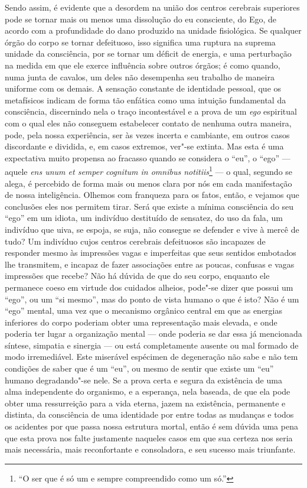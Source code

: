 Sendo assim, é evidente que a desordem na união dos centros cerebrais
superiores pode se tornar mais ou menos uma dissolução do eu
consciente, do Ego, de acordo com a profundidade do dano produzido na
unidade fisiológica.  Se qualquer órgão do corpo se tornar defeituoso,
isso significa uma ruptura na suprema unidade da consciência, por se
tornar um déficit de energia, e uma perturbação na medida em que ele
exerce influência sobre outros órgãos; é como quando, numa junta de
cavalos, um deles não desempenha seu trabalho de maneira uniforme com
os demais.  A sensação constante de identidade pessoal, que os
metafísicos indicam de forma tão enfática como uma intuição fundamental
da consciência, discernindo nela o traço incontestável e a prova de um
\textit{ego} espiritual com o qual eles não conseguem estabelecer
contato de nenhuma outra maneira, pode, pela nossa experiência, ser às
vezes incerta e cambiante, em outros casos discordante e dividida, e,
em casos extremos, ver"-se extinta.  Mas esta é uma expectativa muito
propensa ao fracasso quando se considera o “eu”, o “ego” --- aquele
\textit{ens unum et semper cognitum in omnibus notitiis}\footnote{ “O ser
que é só um e sempre compreendido como um só.”}
--- o qual, segundo se alega, é percebido de forma mais ou menos clara
por nós em cada manifestação de nossa inteligência.  Olhemos com
franqueza para os fatos, então, e vejamos que conclusões eles nos
permitem tirar.  Será que existe a mínima consciência do seu “ego” em
um idiota, um indivíduo destituído de sensatez, do uso da fala, um
indivíduo que uiva, se espoja, se suja, não consegue se defender e vive
à mercê de tudo?  Um indivíduo cujos centros cerebrais defeituosos são
incapazes de responder mesmo às impressões vagas e imperfeitas que seus
sentidos embotados lhe transmitem, e incapaz de fazer associações entre
as poucas, confusas e vagas impressões que recebe?  Não há dúvida de
que do seu corpo, enquanto ele permanece coeso em virtude dos cuidados
alheios, pode"-se dizer que possui um “ego”, ou um “si mesmo”, mas do
ponto de vista humano o que é isto?  Não é um “ego” mental, uma vez que
o mecanismo orgânico central em que as energias inferiores do corpo
poderiam obter uma representação mais elevada, e onde poderia ter lugar
a organização mental --- onde poderia se dar essa já mencionada síntese,
simpatia e sinergia --- ou está completamente ausente ou mal formado de
modo irremediável.  Este miserável espécimen de degeneração não sabe e
não tem condições de saber que é um “eu”, ou mesmo de sentir que existe
um “eu” humano degradando"-se nele.  Se a prova certa e segura da
existência de uma alma independente do organismo, e a esperança, nela
baseada, de que ela pode obter uma ressurreição para a vida eterna,
jazem na existência, permanente e distinta, da consciência de uma
identidade por entre todas as mudanças e todos os acidentes por que
passa nossa estrutura mortal, então é sem dúvida uma pena que esta
prova nos falte justamente naqueles casos em que sua certeza nos seria
mais necessária, mais reconfortante e consoladora, e seu sucesso mais
triunfante.

